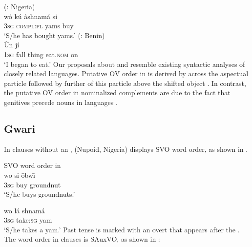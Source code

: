 \documentclass[output=paper]{LSP/langsci}
\begin{document}
\ea  \label{ex:9a:gwari}  (: Nigeria)	\\
\gll w\'o k\'u \`{a}shnam\'a si \\
3\textsc{sg} \textsc{compl:pl} yams buy \\
\glt `S/he has bought yams.' \hfill \citep[][56]{hyman1970}
\ex \label{ex:9b:fongbe}
 (: Benin)	\\
\gll \`Un    j\'i  \\
1\textsc{sg} fall thing eat.\textsc{nom} on  \\
\glt `I began to eat.' \hfill \citep[][215]{lefebvre2002}
\z
\z 
Our proposals about  and  resemble existing syntactic analyses of closely related languages. Putative OV order in  is derived by  across the aspectual particle followed by further  of this particle above the shifted object \citep{manfredi97,kandy03,aboh09}. In contrast, the putative OV order in  nominalized complements are due to the fact that genitives precede nouns in  languages \citep{aboh05}.

%
%

\subsection{Gwari}

In clauses without an ,  (Nupoid, Nigeria) displays SVO word order, as shown in .

\ea \label{ex:10:gwari}
SVO word order in 	\\
\ea 
\gll wo si \=obw\=\i \\
3\textsc{sg} buy groundnut \\
\glt `S/he buys groundnuts.' \hfill \citep[][51]{hyman1970}	

\ex \gll wo l\'a shnam\'a \\
3\textsc{sg} take:\textsc{sg} yam \\
\glt `S/he takes a yam.' \hfill \citep[][51]{hyman1970}	
\z
\z
Past tense is marked with an overt  that appears after the . The word order in  clauses is SAuxVO, as shown in :
\end{document}
